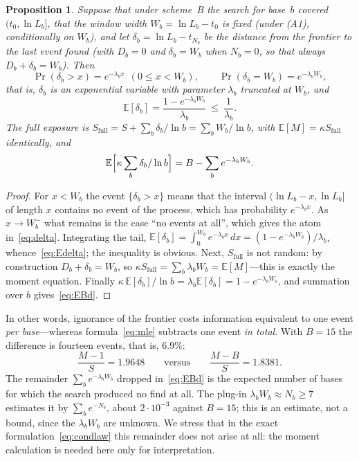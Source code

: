 \documentclass[11pt,a4paper]{article}
\theoremstyle{plain}
\newtheorem{proposition}{Proposition}
\theoremstyle{remark}
\begin{document}
\begin{proposition}\label{prop:delta}
Suppose that under scheme~B the search for base~$b$ covered $(t_0,\ln L_b]$,
that the window width $W_b=\ln L_b-t_0$ is fixed (under (A1), conditionally on
$W_b$), and let $\delta_b=\ln L_b-t_{N_b}$ be the distance from the frontier to
the last event found (with $D_b=0$ and $\delta_b=W_b$ when $N_b=0$, so that
always $D_b+\delta_b=W_b$). Then
\begin{equation}\label{eq:delta}
\Pr(\delta_b>x)=e^{-\lambda_b x}\ \ (0\le x<W_b),\qquad
\Pr(\delta_b=W_b)=e^{-\lambda_b W_b},
\end{equation}
that is, $\delta_b$ is an exponential variable with parameter $\lambda_b$
truncated at $W_b$, and
\begin{equation}\label{eq:Edelta}
\mathbb E[\delta_b]=\frac{1-e^{-\lambda_b W_b}}{\lambda_b}\ \le\ \frac{1}{\lambda_b}.
\end{equation}
The full exposure is
$S_{\mathrm{full}}=S+\sum_b\delta_b/\ln b=\sum_b W_b/\ln b$, with
$\mathbb E[M]=\kappa S_{\mathrm{full}}$ identically, and
\begin{equation}\label{eq:EBd}
\mathbb E\Bigl[\kappa\sum_b\delta_b/\ln b\Bigr]=B-\sum_b e^{-\lambda_b W_b}.
\end{equation}
\end{proposition}

\begin{proof}
For $x<W_b$ the event $\{\delta_b>x\}$ means that the interval
$(\ln L_b-x,\ln L_b]$ of length $x$ contains no event of the process, which has
probability $e^{-\lambda_b x}$. As $x\to W_b^-$ what remains is the case ``no
events at all'', which gives the atom in~\eqref{eq:delta}. Integrating the tail,
$\mathbb E[\delta_b]=\int_0^{W_b}e^{-\lambda_b x}\,dx=(1-e^{-\lambda_b W_b})/\lambda_b$,
whence~\eqref{eq:Edelta}; the inequality is obvious. Next, $S_{\mathrm{full}}$ is
not random: by construction $D_b+\delta_b=W_b$, so
$\kappa S_{\mathrm{full}}=\sum_b\lambda_b W_b=\mathbb E[M]$---this is exactly the
moment equation. Finally
$\kappa\,\mathbb E[\delta_b]/\ln b=\lambda_b\mathbb E[\delta_b]=1-e^{-\lambda_b W_b}$,
and summation over $b$ gives~\eqref{eq:EBd}.
\end{proof}

In other words, ignorance of the frontier costs information equivalent to one
event \emph{per base}---whereas formula~\eqref{eq:mle} subtracts one event
\emph{in total}. With $B=15$ the difference is fourteen events, that is, $6.9\%$:
\begin{equation}\label{eq:cost}
\frac{M-1}{S}=1.9648\qquad\text{versus}\qquad\frac{M-B}{S}=1.8381 .
\end{equation}
The remainder $\sum_b e^{-\lambda_b W_b}$ dropped in~\eqref{eq:EBd} is the
expected number of bases for which the search produced no find at all. The
plug-in $\lambda_bW_b\approx N_b\ge7$ estimates it by $\sum_be^{-N_b}$, about
$2\cdot10^{-3}$ against $B=15$; this is an estimate, not a bound, since the
$\lambda_bW_b$ are unknown. We stress that in the exact formulation~\eqref{eq:condlaw} this
remainder does not arise at all: the moment calculation is needed here only for
interpretation.
\end{document}
